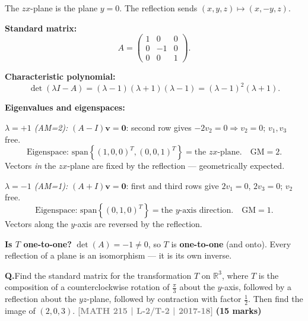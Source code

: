 \documentclass[12pt,a3paper]{article}
\newcommand{\yr}[1]{\hfill\textcolor{gray}{\small\textbf{[#1]}}}
\newcommand{\mk}[1]{\textcolor{orange!70!black}{\small\textbf{(#1 marks)}}}
\newcounter{qnum}
\newcommand{\Q}[1]{%
  \needspace{4\baselineskip}
  \refstepcounter{qnum}
  \vspace{6pt}
  \noindent\textbf{Q\theqnum.}\enspace #1\par
}
\begin{document}
\begin{tcolorbox}[enhanced,breakable,
  colback=cF!4,colframe=cF,boxrule=0.8pt,arc=5pt,
  title={\textbf{Answer --- Reflection about the $zx$-Plane: Eigenvalues, Eigenvectors, One-to-One?}},
  fonttitle=\bfseries\color{white},colbacktitle=cF]

The $zx$-plane is the plane $y=0$. The reflection sends $(x,y,z)\mapsto(x,-y,z)$.

\textbf{Standard matrix:}
\[
A=\begin{pmatrix}1&0&0\\0&-1&0\\0&0&1\end{pmatrix}.
\]

\textbf{Characteristic polynomial:}
\[
\det(\lambda I-A)=(\lambda-1)(\lambda+1)(\lambda-1)=(\lambda-1)^2(\lambda+1).
\]

\textbf{Eigenvalues and eigenspaces:}

\textit{$\lambda=+1$ (AM=2):}
$(A-I)\mathbf{v}=\mathbf{0}$: second row gives $-2v_2=0\Rightarrow v_2=0$; $v_1,v_3$ free.
\[
\text{Eigenspace: }\mathrm{span}\!\left\{(1,0,0)^T,(0,0,1)^T\right\}=\text{the }zx\text{-plane}.\quad\text{GM}=2.
\]
Vectors \textit{in} the $zx$-plane are fixed by the reflection — geometrically expected. \checkmark

\textit{$\lambda=-1$ (AM=1):}
$(A+I)\mathbf{v}=\mathbf{0}$: first and third rows give $2v_1=0$, $2v_3=0$; $v_2$ free.
\[
\text{Eigenspace: }\mathrm{span}\!\left\{(0,1,0)^T\right\}=\text{the }y\text{-axis direction}.\quad\text{GM}=1.
\]
Vectors along the $y$-axis are reversed by the reflection. \checkmark

\textbf{Is $T$ one-to-one?} $\det(A)=-1\neq0$, so $T$ is \textbf{one-to-one} (and onto). Every reflection of a plane is an isomorphism — it is its own inverse.

\end{tcolorbox}


\Q{Find the standard matrix for the transformation $T$ on $\mathbb{R}^3$, where $T$ is the composition of a counterclockwise rotation of $\frac{\pi}{3}$ about the $y$-axis, followed by a reflection about the $yz$-plane, followed by contraction with factor $\frac{1}{2}$. Then find the image of $(2,0,3)$.
\yr{MATH 215 | L-2/T-2 | 2017-18} \mk{15}}
\end{document}
